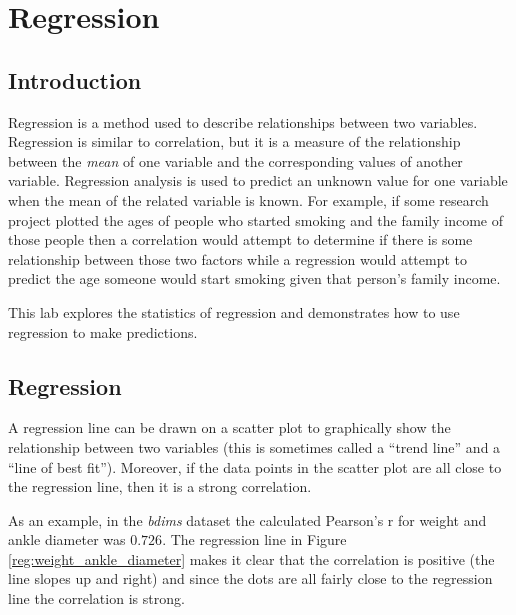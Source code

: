 \chapter{Regression}\label{reg:regression}

\section{Introduction}

Regression is a method used to describe relationships between two variables. Regression is similar to correlation, but it is a measure of the relationship between the \textit{mean} of one variable and the corresponding values of another variable. Regression analysis is used to predict an unknown value for one variable when the mean of the related variable is known. For example, if some research project plotted the ages of people who started smoking and the family income of those people then a correlation would attempt to determine if there is some relationship between those two factors while a regression would attempt to predict the age someone would start smoking given that person's family income.

This lab explores the statistics of regression and demonstrates how to use regression to make predictions.

\section{Regression}

A regression line can be drawn on a scatter plot to graphically show the relationship between two variables (this is sometimes called a ``trend line'' and a ``line of best fit''). Moreover, if the data points in the scatter plot are all close to the regression line, then it is a strong correlation.

As an example, in the \textit{bdims} dataset the calculated Pearson's r for weight and ankle diameter was $ 0.726 $. The regression line in Figure \ref{reg:weight_ankle_diameter} makes it clear that the correlation is positive (the line slopes up and right) and since the dots are all fairly close to the regression line the correlation is strong. 

